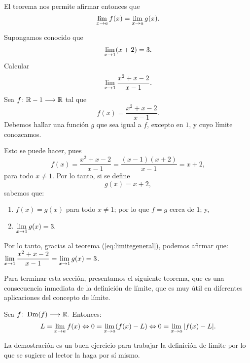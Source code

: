 El teorema nos permite afirmar entonces que
\[
      \limjc{f(x)}{x}{a} = \limjc{g(x)}{x}{a}.
\]


\begin{exemplo}[Solución]{%
Supongamos conocido que
\[
   \limjc{(x + 2)}{x}{1} = 3.
\]
Calcular
\[
   \limjc{\frac{x^2 + x - 2}{x - 1}}{x}{1} .
\]
}%
Sea $\funcjc{f}{\mathbb{R} - {1}}{\mathbb{R}}$ tal que
\[
f(x) = \frac{x^2 + x - 2}{x - 1}.
\]
Debemos hallar una función $g$ que sea igual a $f$, excepto en $1$, y cuyo límite conozcamos.

Esto se puede hacer, pues
\[
   f(x) = \frac{x^2 + x - 2}{x - 1} = \frac{(x - 1)(x + 2)}{x - 1} = x + 2,
\]
para todo $x \neq 1$. Por lo tanto, si se define
\[
   g(x) = x + 2,
\]
sabemos que:
\begin{enumerate}
\item $f(x) = g(x)$ para todo $x \neq 1$; por lo que $f=g$ cerca de $1$; y,
\item $\displaystyle\limjc{g(x)}{x}{1} = 3.$
\end{enumerate}
Por lo tanto, gracias al teorema (\ref{eq:limitegeneral}), podemos afirmar que:
$\displaystyle
   \limjc{\frac{x^2 + x - 2}{x - 1}}{x}{1} = \limjc{g(x)}{x}{1} = 3$.
\end{exemplo}

Para terminar esta sección, presentamos el siguiente teorema, que es una consecuencia inmediata de
la definición de límite, que es muy útil en diferentes aplicaciones del concepto de límite.

\begin{teocal}\label{teol:LEquiv0} Sea $\funcjc{f}{\Dm(f)}{\mathbb{R}}.$ Entonces:
\[
   L = \limjc{f(x)}{x}{a} \Leftrightarrow 0 = \limjc{(f(x) - L)}{x}{a} \Leftrightarrow
   0 = \limjc{|f(x) - L|}{x}{a}.
\]
\end{teocal}%

La demostración es un buen ejercicio para trabajar la definición de límite por lo que se sugiere al
lector la haga por sí mismo.

